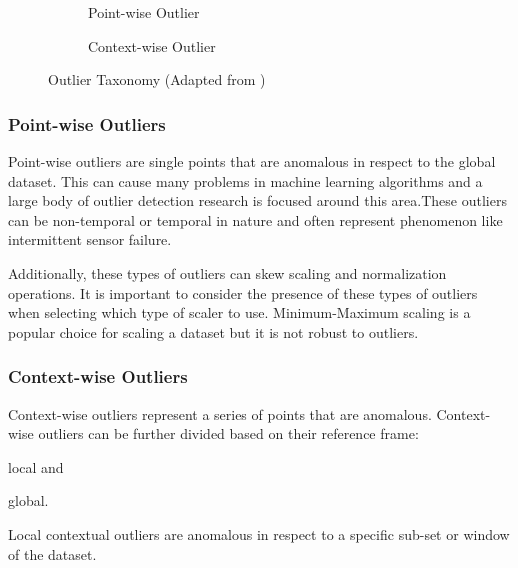 
\begin{figure}[H]
     \centering
     \begin{subfigure}[b]{0.475\textwidth}
         \centering
         {\resizebox{\textwidth}{!}{}}
         \caption{Point-wise Outlier}
         \label{fig:point}
     \end{subfigure}
     \hfill
     \begin{subfigure}[b]{0.475\textwidth}
         \centering
          {\resizebox{\textwidth}{!}{}}
         \caption{Context-wise Outlier}
         \label{fig:contextual}
     \end{subfigure}
        \caption{Outlier Taxonomy (Adapted from \cite{lai2021revisiting})}
        \label{fig:outliers-graphic}
\end{figure}

\subsubsection{Point-wise Outliers}

Point-wise outliers are single points that are anomalous in respect to the global dataset. This can cause many problems in machine learning algorithms and a large body of outlier detection research is focused around this area.These outliers can be non-temporal or temporal in nature and often represent phenomenon like intermittent sensor failure. 

Additionally, these types of outliers can skew scaling and normalization operations. It is important to consider the presence of these types of outliers when selecting which type of scaler to use. Minimum-Maximum scaling is a popular choice for scaling a dataset but it is not robust to outliers. 

\subsubsection{Context-wise Outliers}

Context-wise outliers represent a series of points that are anomalous. Context-wise outliers can be further divided based on their reference frame: 
\begin{inlinelist}
    \item local and
    \item global.
\end{inlinelist}
Local contextual outliers are anomalous in respect to a specific sub-set or window of the dataset.

